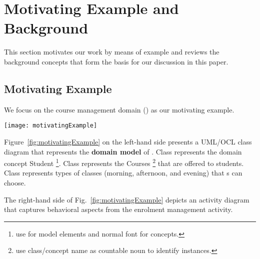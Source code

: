 \section{Motivating Example and Background} \label{sect:background}

This section motivates our work by means of example and reviews the background concepts that form the basis for our discussion in this paper.

\subsection{Motivating Example} 
\label{sect:bg-courseman-eg}

We focus on the course management domain (\courseman) as our motivating example.

\begin{figure*}[ht]
	\begin{center}
		\texttt{[image: motivatingExample]}
	\end{center}
	\caption{Simplified UML/OCL class and activity diagrams to specify a \courseman~software variant that handles the enrolment management activity.} %
	\label{fig:motivatingExample}
\end{figure*} 

Figure~\ref{fig:motivatingExample} on the left-hand side presents a UML/OCL class diagram that represents the \textbf{domain model} of \courseman. 
Class  represents the domain concept Student%
\footnote{use  for model elements and normal font for concepts.}. %
Class  represents the Courses%
\footnote{use class/concept name as countable noun to identify instances.} %
that are offered to students. Class  represents types of classes (\eg morning, afternoon, and evening) that s
can choose. 

The right-hand side of Fig.~\ref{fig:motivatingExample} depicts an activity diagram that captures behavioral aspects from the enrolment management activity.


